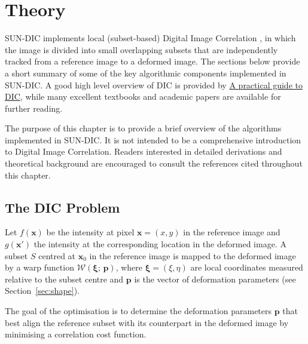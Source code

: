 \chapter{Theory}
\label{sec:theory}

SUN-DIC implements local (subset-based) Digital Image Correlation
\citep{Sutton2009, Pan2018}, in which the image is divided into small overlapping
subsets that are independently tracked from a reference image to a deformed image.
The sections below provide a short summary of some of the key algorithmic components implemented in SUN-DIC. A good high level overview of DIC is provided by \href{https://digitalimagecorrelation.org/}{A practical guide to DIC}, while many excellent textbooks and academic papers are available for further reading.

\begin{grayquote}
	The purpose of this chapter is to provide a brief overview of the algorithms implemented in SUN-DIC. It is not intended to be a comprehensive introduction to Digital Image Correlation. Readers interested in detailed derivations and theoretical background are encouraged to consult the references cited throughout this chapter.
\end{grayquote}

\section{The DIC Problem}

Let $f(\mathbf{x})$ be the intensity at pixel $\mathbf{x} = (x, y)$ in the reference
image and $g(\mathbf{x}')$ the intensity at the corresponding location in the deformed
image. A subset $S$ centred at $\mathbf{x}_0$ in the reference image is mapped to the
deformed image by a warp function $\mathcal{W}(\boldsymbol{\xi};\,\mathbf{p})$,
where $\boldsymbol{\xi} = (\xi,\eta)$ are local coordinates measured relative to the
subset centre and $\mathbf{p}$ is the vector of deformation parameters
(see Section~\ref{sec:shape}).

The goal of the optimisation is to determine the deformation parameters $\mathbf{p}$
that best align the reference subset with its counterpart in the deformed image by
minimising a correlation cost function.

